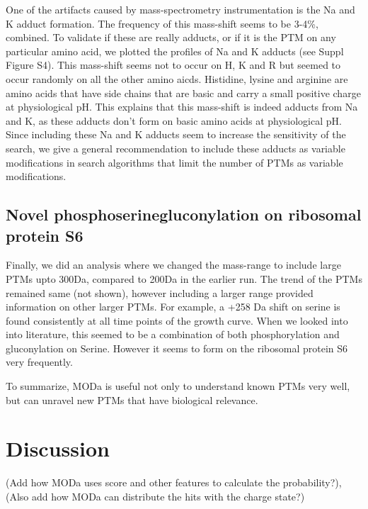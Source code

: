 \documentclass[12pt]{article}
\begin{document}
One of the artifacts caused by mass-spectrometry instrumentation is the Na and K adduct formation. The frequency of this mass-shift seems to be 3-4\%, combined. To validate if these are really adducts, or if it is the PTM on any particular amino acid, we plotted the profiles of Na and K adducts (see Suppl Figure S4). This mass-shift seems not to occur on H, K and R but seemed to occur randomly on all the other amino aicds. Histidine, lysine and arginine are amino acids that have side chains that are basic and carry a small positive charge at physiological pH. This explains that this mass-shift is indeed adducts from Na and K, as these adducts don't form on basic amino acids at physiological pH. Since including these Na and K adducts seem to increase the sensitivity of the search, we give a general recommendation to include these adducts as variable modifications in search algorithms that limit the number of PTMs as variable modifications. 

\subsection{Novel phosphoserinegluconylation on ribosomal protein S6}
Finally, we did an analysis where we changed the mass-range to include large PTMs upto 300Da, compared to 200Da in the earlier run. The trend of the PTMs remained same (not shown), however including a larger range provided information on other larger PTMs. For example, a +258 Da shift on serine is found consistently at all time points of the growth curve. When we looked into into literature, this seemed to be a combination of both phosphorylation and gluconylation on Serine. However it seems to form on the ribosomal protein S6 very frequently.

To summarize, MODa is useful not only to understand known PTMs very well, but can unravel new PTMs that have biological relevance.

\section{Discussion}

(Add how MODa uses score and other features to calculate the probability?), (Also add how MODa can distribute the hits with the charge state?)
\end{document}
